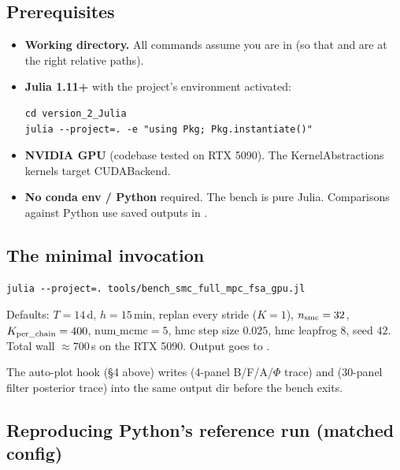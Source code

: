 \documentclass[11pt,a4paper]{article}
\begin{document}
\subsection{Prerequisites}

\begin{itemize}[itemsep=2pt,leftmargin=*]
\item \textbf{Working directory.} All commands assume you are in
   (so that  and
   are at the right relative paths).
\item \textbf{Julia 1.11+} with the project's environment activated:
\begin{verbatim}
cd version_2_Julia
julia --project=. -e "using Pkg; Pkg.instantiate()"
\end{verbatim}
\item \textbf{NVIDIA GPU} (codebase tested on RTX 5090). The
  KernelAbstractions kernels target CUDABackend.
\item \textbf{No conda env / Python} required. The bench is pure
  Julia. Comparisons against Python use saved  outputs in
  .
\end{itemize}

\subsection{The minimal invocation}

\begin{verbatim}
julia --project=. tools/bench_smc_full_mpc_fsa_gpu.jl
\end{verbatim}

Defaults: $T = 14\,$d, $h = 15\,$min, replan every stride
($K = 1$), $n_{\rm smc} = 32$, $K_{\rm per\_chain} = 400$, $\text{num\_mcmc} = 5$,
hmc step size $0.025$, hmc leapfrog $8$, seed $42$. Total wall
$\approx 700\,$s on the RTX 5090. Output goes to
.

The auto-plot hook (\S 4 above) writes
 (4-panel B/F/A/$\Phi$ trace) and
 (30-panel filter posterior
trace) into the same output dir before the bench exits.

\subsection{Reproducing Python's reference run (matched config)}
\end{document}
